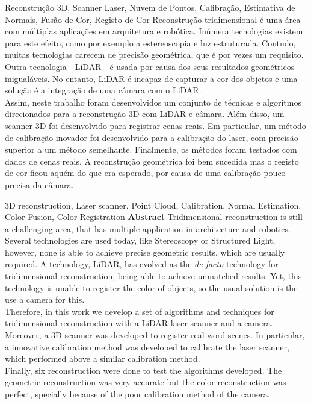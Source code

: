
\TitlePage
\vspace*{55mm}
    {Reconstrução 3D, Scanner Laser, Nuvem de Pontos, Calibração, Estimativa de Normais, Fusão de Cor, Registo de Cor}
\vspace*{15mm}
    { Reconstrução tridimensional é uma área com múltiplas aplicações em arquitetura e robótica. Inúmera tecnologias existem para este efeito, como por exemplo a estereoscopia e luz estruturada. Contudo, muitas tecnologias carecem de precisão geométrica, que é por vezes um requisito. Outra tecnologia - LiDAR - é usada por causa dos seus resultados geométricos inigualáveis. No entanto, LiDAR é incapaz de capturar a cor dos objetos e uma solução é a integração de uma câmara com o LiDAR.\\
      Assim, neste trabalho foram desenvolvidos um conjunto de técnicas e algoritmos direcionados para a reconstrução 3D com LiDAR e câmara. Além disso, um scanner 3D foi desenvolvido para registrar cenas reais. Em particular, um método de calibração inovador foi desenvolvido para a calibração do laser, com precisão superior a um método semelhante.
      Finalmente, os métodos foram testados com dados de cenas reais. A reconstrução geométrica foi bem sucedida mas o registo de cor ficou aquém do que era esperado, por causa de uma calibração pouco precisa da câmara.
    }
\EndTitlePage
\titlepage\ \endtitlepage

\TitlePage
\vspace*{55mm}
    {3D reconstruction, Laser scanner, Point Cloud, Calibration, Normal Estimation, Color Fusion, Color Registration}
\vspace*{15mm}
\TEXT
    {\textbf{Abstract}}
    { Tridimensional reconstruction is still a challenging area, that has multiple application in architecture and robotics. Several technologies are used today, like Stereoscopy or Structured Light, however, none is able to achieve precise geometric results, which are usually required. A technology, LiDAR, has evolved as the \textit{de facto} technology for tridimensional reconstruction, being able to achieve unmatched results. Yet, this technology is unable to register the color of objects, so the usual solution is the use a camera for this.\\
    Therefore, in this work we develop a set of algorithms and techniques for tridimensional reconstruction with a LiDAR laser scanner and a camera. Moreover, a 3D scanner was developed to register real-word scenes. In particular, a innovative calibration method was developed to calibrate the laser scanner, which performed above a similar calibration method. \\
    Finally, six reconstruction were done to test the algorithms developed. The geometric reconstruction was very accurate but the color reconstruction was perfect, specially because of the poor calibration method of the camera.}
\EndTitlePage
\titlepage\ \endtitlepage
